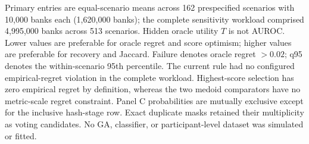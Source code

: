 \begin{table}[p]
\begin{minipage}{0.98\linewidth}\scriptsize\vspace{0.35em}
Primary entries are equal-scenario means across 162 prespecified scenarios with 10,000 banks each (1,620,000 banks); the complete sensitivity workload comprised 4,995,000 banks across 513 scenarios. Hidden oracle utility $T$ is not AUROC. Lower values are preferable for oracle regret and score optimism; higher values are preferable for recovery and Jaccard. Failure denotes oracle regret $>0.02$; q95 denotes the within-scenario 95th percentile. The current rule had no configured empirical-regret violation in the complete workload. Highest-score selection has zero empirical regret by definition, whereas the two medoid comparators have no metric-scale regret constraint. Panel C probabilities are mutually exclusive except for the inclusive hash-stage row. Exact duplicate masks retained their multiplicity as voting candidates. No GA, classifier, or participant-level dataset was simulated or fitted.
\end{minipage}
\end{table}
